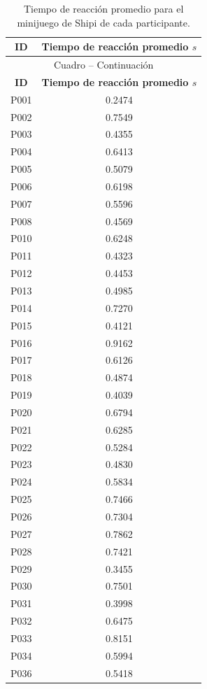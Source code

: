 \begin{longtable}{|c|c|}

    \caption{Tiempo de reacción promedio para el minijuego de Shipi de cada participante.}
    \label{tab:reaccionPromedio}\\
    \hline

    \textbf{ID} &
    \textbf{Tiempo de reacción promedio \(s\)} \\ \hline

    \endfirsthead

    \multicolumn{2}{c}{
        Cuadro \thetable{} -- Continuación
    } \\
    \hline

    \textbf{ID} &
    \textbf{Tiempo de reacción promedio \(s\)} \\ \hline

    \endhead

    P001 & 0.2474 \\ \hline
    P002 & 0.7549 \\ \hline
    P003 & 0.4355 \\ \hline
    P004 & 0.6413 \\ \hline
    P005 & 0.5079 \\ \hline
    P006 & 0.6198 \\ \hline
    P007 & 0.5596 \\ \hline
    P008 & 0.4569 \\ \hline
    P010 & 0.6248 \\ \hline
    P011 & 0.4323 \\ \hline
    P012 & 0.4453 \\ \hline
    P013 & 0.4985 \\ \hline
    P014 & 0.7270 \\ \hline
    P015 & 0.4121 \\ \hline
    P016 & 0.9162 \\ \hline
    P017 & 0.6126 \\ \hline
    P018 & 0.4874 \\ \hline
    P019 & 0.4039 \\ \hline
    P020 & 0.6794 \\ \hline
    P021 & 0.6285 \\ \hline
    P022 & 0.5284 \\ \hline
    P023 & 0.4830 \\ \hline
    P024 & 0.5834 \\ \hline
    P025 & 0.7466 \\ \hline
    P026 & 0.7304 \\ \hline
    P027 & 0.7862 \\ \hline
    P028 & 0.7421 \\ \hline
    P029 & 0.3455 \\ \hline
    P030 & 0.7501 \\ \hline
    P031 & 0.3998 \\ \hline
    P032 & 0.6475 \\ \hline
    P033 & 0.8151 \\ \hline
    P034 & 0.5994 \\ \hline
    P036 & 0.5418 \\ \hline


\end{longtable}
